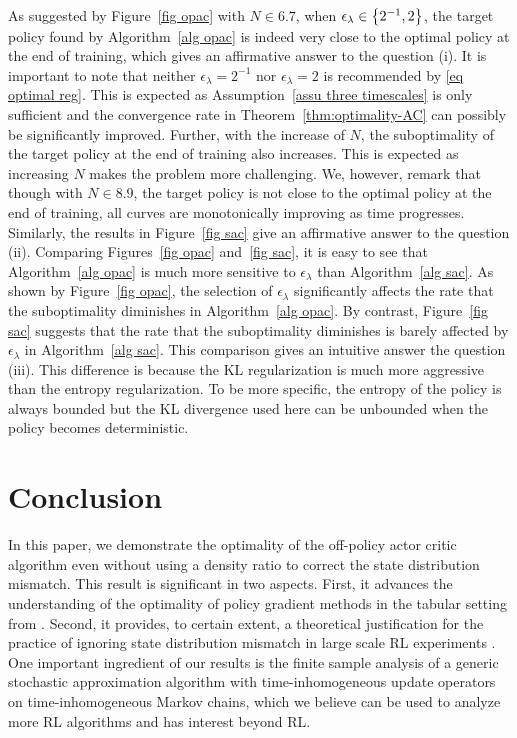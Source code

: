 \documentclass[twoside,11pt]{article}
\numberwithin{assucounter}{section}
\begin{document}
As suggested by Figure~\ref{fig opac} with $N \in \qty{6, 7}$,
when $\epsilon_\lambda \in \qty{2^{-1}, 2}$,
the target policy found by Algorithm~\ref{alg opac} is indeed very close to the optimal policy at the end of training,
which gives an affirmative answer to the question (i).
It is important to note that neither $\epsilon_\lambda = 2^{-1}$ nor $\epsilon_\lambda = 2$
is recommended by \eqref{eq optimal reg}.
This is expected as Assumption~\ref{assu three timescales} is only sufficient and
the convergence rate in Theorem~\ref{thm:optimality-AC} can possibly be significantly improved.
Further, with the increase of $N$,
the suboptimality of the target policy at the end of training also increases.
This is expected as increasing $N$ makes the problem more challenging.
We,
however,
remark that though with $N \in \qty{8, 9}$,
the target policy is not close to the optimal policy at the end of training,
all curves are monotonically improving as time progresses.
Similarly,
the results in Figure~\ref{fig sac} give an affirmative answer to the question (ii).
Comparing Figures~\ref{fig opac} and~\ref{fig sac},
it is easy to see that Algorithm~\ref{alg opac} is much more sensitive to $\epsilon_\lambda$ than Algorithm~\ref{alg sac}.
As shown by Figure~\ref{fig opac},
the selection of $\epsilon_\lambda$ significantly affects the rate that the suboptimality diminishes in Algorithm~\ref{alg opac}.
By contrast, 
Figure~\ref{fig sac} suggests that the rate that the suboptimality diminishes is barely affected by $\epsilon_\lambda$ in Algorithm~\ref{alg sac}. 
This comparison gives an intuitive answer the question (iii).
This difference is because the KL regularization is much more aggressive than the entropy regularization.
To be more specific,
the entropy of the policy is always bounded but the KL divergence used here can be unbounded when the policy becomes deterministic.

\section{Conclusion}
In this paper,
we demonstrate the optimality of the off-policy actor critic algorithm even without using a density ratio to correct the state distribution mismatch.
This result is significant in two aspects.
First,
it advances the understanding of the optimality of policy gradient methods in the tabular setting from \citet{agarwal2019optimality,mei2020global,laroche2021dr}.
Second,
it provides,
to certain extent,
a theoretical justification
for the practice of ignoring state distribution mismatch in large scale RL experiments \citep{wang2016sample,espeholt2018impala,vinyals2019grandmaster,schmitt2020off,zahavy2020self}.
One important ingredient of our results is the finite sample analysis of a generic stochastic approximation algorithm with time-inhomogeneous update operators on time-inhomogeneous Markov chains,
which we believe can be used to analyze more RL algorithms and has interest beyond RL.
\end{document}
